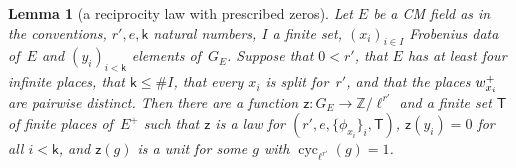 \documentclass[11pt,a4paper]{article}
\newcommand{\m}[1]{\mbox{$#1$}}        %
\theoremstyle{plainx}
\newtheorem{lemma}[theorem]{Lemma}
\theoremstyle{uprightx}
\newcommand{\GE}[1]{G_{#1}}
\newcommand{\cyc}{\operatorname{cyc}}
\begin{document}
\begin{lemma}[a reciprocity law with prescribed zeros]\label{l:law}
Let $E$ be a CM field as in the conventions, \m{r',e,\mathsf{k}} natural numbers, $I$ a finite set, \m{(x_i)_{i\in I}}
Frobenius data of~$E$ and \m{(y_i)_{i<\mathsf{k}}} elements of~\m{\GE{E}}. Suppose that \m{0<r'}, that $E$ has at least four
infinite places, that \m{\mathsf{k}\le\#I}, that every $x_i$ is split for~$r'$, and that the places
\m{\primeBelowPlus{w_{x_i}}} are pairwise distinct. Then there are a function \m{\mathsf{z}\colon\GE{E}\to\mathbb{Z}/\ell^{r'}} and
a finite set $\mathsf{T}$ of finite places of~$E^{+}$ such that $\mathsf{z}$ is a law for \m{(r',e,\{\phi_{x_i}\}_i,\mathsf{T})},
\m{\mathsf{z}(y_i)=0} for all \m{i<\mathsf{k}}, and \m{\mathsf{z}(g)} is a unit for some $g$ with \m{\cyc_{\ell^{r'}}(g)=1}.
\end{lemma}
\end{document}
